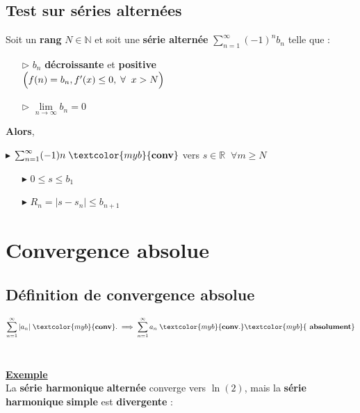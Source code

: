 \documentclass{report}
\begin{document}
\begin{multicols*}{3}
     \section{Test sur séries alternées}
     Soit un \textbf{rang} $N \in \mathbb{N}$ et 
     soit une \textbf{série alternée} 
     $\sum_{n=1}^{\infty } (-1)^nb_n$ telle que :
     \begin{itemize}
       \item [$\rhd$ ]  $b_n$ \textbf{décroissante}  et \textbf{positive} \\
           $\Bigl(f(n) = b_n, f^{\prime}(x) \leq 0, \; \forall \;\; x > N\Bigr)$
       \item [$\rhd$ ] $\lim\limits_{n\to\infty }b_n = 0$ 
     \end{itemize}
     
     \textbf{Alors}, 

    \noindent
    $\blacktriangleright$
    $\sum_{n=1}^{\infty }  (-1)n \; \textcolor{myb}{\textbf{conv}}$ vers $s \in
    \mathbb{R} \;\; \forall m \geq N $ 

     \begin{itemize}
    \item[$\blacktriangleright$]
    $0 \leq s \leq b_1$ 
        \item[$\blacktriangleright$] 
    $R_n = |s - s_n | \leq b_{n+1}$
     \end{itemize}
\vspace{-3.5em}
\chapter{Convergence absolue}
    \section{Définition de convergence absolue}
    \vspace{-2em}
     \[%
        \sum_{n=1}^{\infty }|a_n| \; \textcolor{myb}{\textbf{conv}}.  \implies 
        \sum_{n=1}^{\infty }a_n \; \textcolor{myb}{\textbf{conv}.} 
        \textcolor{myb}{\textbf{ absolument}}  
     \]%
    \\
     
    \vspace{1em}
    \noindent 
    \underline{\textbf{Exemple}} 
    \vspace{1em}\\
    La \textbf{série harmonique} \textcolor{myb}{\textbf{alternée}} converge 
    vers $\ln(2)$, mais la \textbf{série harmonique} 
    \textcolor{myr}{\textbf{simple}} est \textcolor{myr}{\textbf{divergente}} :  



\end{multicols*}
\end{document}
